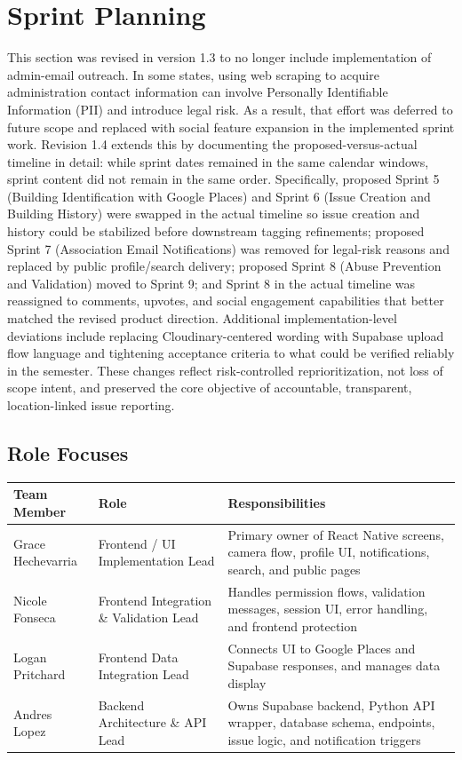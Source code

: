 \documentclass[12pt]{article}
\begin{document}
\section{Sprint Planning}
This section was revised in version 1.3 to no longer include implementation of admin-email outreach. In some states, using web scraping to acquire administration contact information can involve Personally Identifiable Information (PII) and introduce legal risk. As a result, that effort was deferred to future scope and replaced with social feature expansion in the implemented sprint work. Revision 1.4 extends this by documenting the proposed-versus-actual timeline in detail: while sprint dates remained in the same calendar windows, sprint content did not remain in the same order. Specifically, proposed Sprint 5 (Building Identification with Google Places) and Sprint 6 (Issue Creation and Building History) were swapped in the actual timeline so issue creation and history could be stabilized before downstream tagging refinements; proposed Sprint 7 (Association Email Notifications) was removed for legal-risk reasons and replaced by public profile/search delivery; proposed Sprint 8 (Abuse Prevention and Validation) moved to Sprint 9; and Sprint 8 in the actual timeline was reassigned to comments, upvotes, and social engagement capabilities that better matched the revised product direction. Additional implementation-level deviations include replacing Cloudinary-centered wording with Supabase upload flow language and tightening acceptance criteria to what could be verified reliably in the semester. These changes reflect risk-controlled reprioritization, not loss of scope intent, and preserved the core objective of accountable, transparent, location-linked issue reporting.


\subsection{Role Focuses}

\vspace{0.3em}

\noindent
\begin{tabular}{|L{3cm}|L{4.5cm}|L{7.5cm}|}
\hline
\textbf{Team Member} & \textbf{Role} & \textbf{Responsibilities} \\
\hline
Grace Hechevarria & Frontend / UI Implementation Lead & Primary owner of React Native screens, camera flow, profile UI, notifications, search, and public pages \\
\hline
Nicole Fonseca & Frontend Integration \& Validation Lead & Handles permission flows, validation messages, session UI, error handling, and frontend protection \\
\hline
Logan Pritchard & Frontend Data Integration Lead & Connects UI to Google Places and Supabase responses, and manages data display \\
\hline
Andres Lopez & Backend Architecture \& API Lead & Owns Supabase backend, Python API wrapper, database schema, endpoints, issue logic, and notification triggers \\
\hline
\end{tabular}
\end{document}

